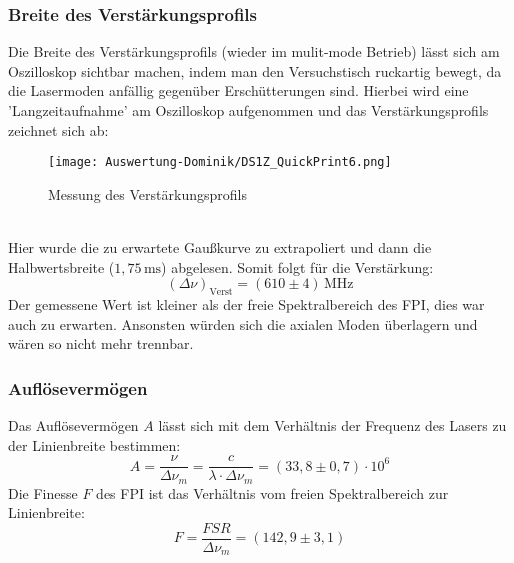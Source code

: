 \subsubsection{Breite des Verstärkungsprofils}
Die Breite des Verstärkungsprofils (wieder im mulit-mode Betrieb) lässt sich am Oszilloskop sichtbar machen, indem man den Versuchstisch ruckartig bewegt, da die Lasermoden anfällig gegenüber Erschütterungen sind.
Hierbei wird eine 'Langzeitaufnahme' am Oszilloskop aufgenommen und das Verstärkungsprofils zeichnet sich ab:
\begin{figure}[h]
    \centering\texttt{[image: Auswertung-Dominik/DS1Z\_QuickPrint6.png]}
    \caption{Messung des Verstärkungsprofils}
\end{figure}\\
Hier wurde die zu erwartete Gaußkurve zu extrapoliert und dann die Halbwertsbreite ($1,75\,\text{ms}$) abgelesen.
Somit folgt für die Verstärkung:
\begin{equation}
    \left(\Delta\nu\right)_\text{Verst}=\left(610\pm4\right)\,\text{MHz}
\end{equation}
Der gemessene Wert ist kleiner als der freie Spektralbereich des FPI, dies war auch zu erwarten. Ansonsten würden sich die axialen Moden überlagern und wären so nicht mehr trennbar.
\subsubsection{Auflösevermögen}
Das Auflösevermögen $A$ lässt sich mit dem Verhältnis der Frequenz des Lasers zu der Linienbreite bestimmen:
\begin{equation}
    A=\frac{\nu}{\Delta\nu_m}=\frac{c}{\lambda\cdot\Delta\nu_m}=\left(33,8\pm0,7\right)\cdot10^6
\end{equation}
Die Finesse $F$ des FPI ist das Verhältnis vom freien Spektralbereich zur Linienbreite:
\begin{equation}
    F=\frac{FSR}{\Delta\nu_m}=\left(142,9\pm3,1\right)
\end{equation}\newpage

